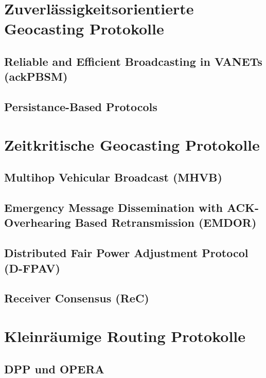 \documentclass[english,runningheads,a4paper]{llncs}[2018/03/10]
\begin{document}
\section{Zuverlässigkeitsorientierte Geocasting Protokolle}
\label{sec:reliabiltyorientedgeoprotocolls}

\subsection{Reliable and Efficient Broadcasting in VANETs (ackPBSM)}

\subsection{Persistance-Based Protocols}

\section{Zeitkritische Geocasting Protokolle}
\label{sec:timecriticalgeoprotocolls}

\subsection{Multihop Vehicular Broadcast (MHVB)}

\subsection{Emergency Message Dissemination with ACK-Overhearing Based Retransmission (EMDOR)}

\subsection{Distributed Fair Power Adjustment Protocol (D-FPAV)}

\subsection{Receiver Consensus (ReC)}

\section{Kleinräumige Routing Protokolle}
\label{sec:smallscaleprotocols}

\subsection{DPP und OPERA}
\end{document}
